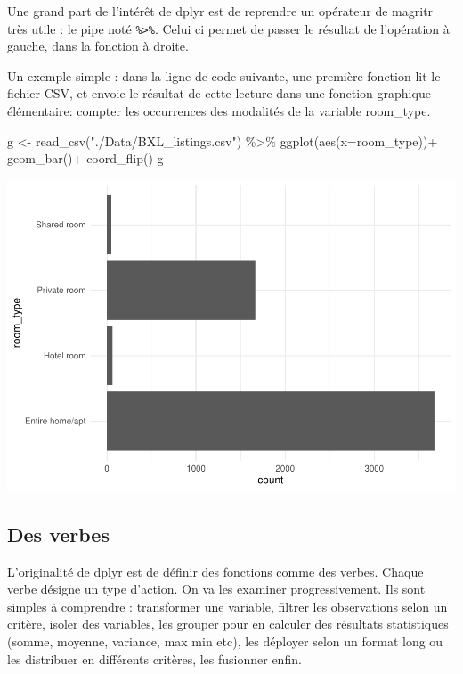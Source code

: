 \documentclass[
]{book}
\newenvironment{Shaded}{\begin{snugshade}}{\end{snugshade}}
\newcommand{\AttributeTok}[1]{\textcolor[rgb]{0.77,0.63,0.00}{#1}}
\newcommand{\FunctionTok}[1]{\textcolor[rgb]{0.00,0.00,0.00}{#1}}
\newcommand{\NormalTok}[1]{#1}
\newcommand{\OtherTok}[1]{\textcolor[rgb]{0.56,0.35,0.01}{#1}}
\newcommand{\SpecialCharTok}[1]{\textcolor[rgb]{0.00,0.00,0.00}{#1}}
\newcommand{\StringTok}[1]{\textcolor[rgb]{0.31,0.60,0.02}{#1}}
\begin{document}
Une grand part de l'intérêt de dplyr est de reprendre un opérateur de magritr très utile : le pipe noté \texttt{\%\textgreater{}\%}. Celui ci permet de passer le résultat de l'opération à gauche, dans la fonction à droite.

Un exemple simple : dans la ligne de code suivante, une première fonction lit le fichier CSV, et envoie le résultat de cette lecture dans une fonction graphique élémentaire: compter les occurrences des modalités de la variable room\_type.

\begin{Shaded}
\begin{Highlighting}[]
\NormalTok{g }\OtherTok{\textless{}{-}} \FunctionTok{read\_csv}\NormalTok{(}\StringTok{"./Data/BXL\_listings.csv"}\NormalTok{) }\SpecialCharTok{\%\textgreater{}\%} 
  \FunctionTok{ggplot}\NormalTok{(}\FunctionTok{aes}\NormalTok{(}\AttributeTok{x=}\NormalTok{room\_type))}\SpecialCharTok{+}
  \FunctionTok{geom\_bar}\NormalTok{()}\SpecialCharTok{+}
  \FunctionTok{coord\_flip}\NormalTok{()}
\NormalTok{g}
\end{Highlighting}
\end{Shaded}

\includegraphics{bookdown-demo_files/figure-latex/0203-1.pdf}

\hypertarget{des-verbes}{%
\subsection{Des verbes}\label{des-verbes}}

L'originalité de dplyr est de définir des fonctions comme des verbes. Chaque verbe désigne un type d'action. On va les examiner progressivement. Ils sont simples à comprendre : transformer une variable, filtrer les observations selon un critère, isoler des variables, les grouper pour en calculer des résultats statistiques (somme, moyenne, variance, max min etc), les déployer selon un format long ou les distribuer en différents critères, les fusionner enfin.
\end{document}
